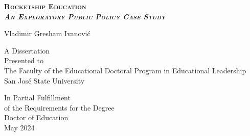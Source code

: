 
\begin{center}
\Large

\textsc{\LARGE\textbf{%
Rocketship Education\\\bigskip
\textnormal{\textit{An Exploratory Public Policy Case Study}}}}\\
\bigskip

Vladimir Gresham Ivanović\\
\vspace{4\baselineskip}

A Dissertation\\
Presented to\\
The Faculty of the Educational Doctoral Program in Educational Leadership\\
San José State University\\
\vspace{3\baselineskip}

In Partial Fulfillment\\
of the Requirements for the Degree\\
Doctor of Education\\
\vspace{3\baselineskip}
May 2024\\


\normalfont
\end{center}

\thispagestyle{empty}

